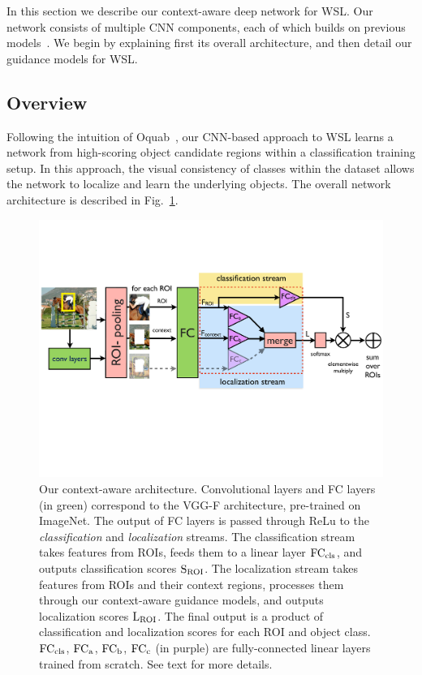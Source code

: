 
In this section we describe our context-aware deep network for WSL.  Our network
consists of multiple CNN components, each of which builds on previous
models~\cite{Oquab:2015us,Girshick_2015_ICCV,Bilen:2015uo,Gidaris:2015cx}. We
begin by explaining first its overall architecture, and then detail our guidance
models for WSL.


\subsection{Overview}

Following the intuition of
Oquab~\etal\cite{Oquab:2015us}, our CNN-based approach to WSL learns a network from high-scoring object
candidate regions within a classification training setup. In this approach, the
visual consistency of classes within the dataset allows the network to localize
and learn the underlying objects. The overall network architecture is described
in Fig.~\ref{fig:model}.

\begin{figure}[t] \includegraphics[width=\textwidth, trim={1mm 7.3cm 1mm 4cm},
clip]{images/model} \caption[small]{Our context-aware architecture. 
Convolutional layers and FC layers (in green) correspond to the VGG-F architecture, pre-trained on ImageNet.
The output of FC layers is passed through ReLu to the {\em classification} and {\em localization} streams. 
The classification stream takes features from ROIs, feeds them to a linear layer ${\rm FC_{cls}}$, and outputs classification scores ${\rm S_{ROI}}$. The localization stream takes features from ROIs and their context regions, processes them through our context-aware guidance models, and outputs localization scores ${\rm L_{ROI}}$. The final output is a product of classification and localization scores for each ROI and object class.
${\rm FC_{cls}}$, ${\rm FC_{a}}$, ${\rm FC_{b}}$, ${\rm FC_{c}}$ (in purple) are fully-connected linear layers trained from scratch. See text for more details.
} 
\label{fig:model} 
\end{figure}



